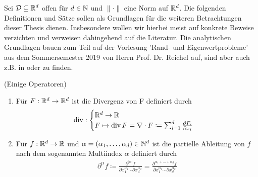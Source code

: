 Sei $\mathcal{D} \subseteq \mathbb{R}^d$ offen für $d\in \mathbb{N}$ und $\lVert \cdot \rVert$ eine Norm auf $\mathbb{R}^d$.
Die folgenden Definitionen und Sätze sollen als Grundlagen für die weiteren Betrachtungen dieser Thesis dienen. Insbesondere wollen wir hierbei meist auf konkrete Beweise verzichten und verweisen dahingehend auf die Literatur. 
Die analytischen Grundlagen bauen zum Teil auf der Vorlesung 'Rand- und Eigenwertprobleme' aus dem Sommersemester 2019 von Herrn Prof. Dr. Reichel auf, sind aber auch  z.B. in \cite{dobrowolski2010angewandte} oder \cite{evans10} zu finden.
\begin{Definition}(Einige Operatoren)
	\begin{enumerate}[label=(\alph*)]
		\item Für $F: \mathbb{R}^d \to \mathbb{R}^d$ ist die Divergenz von F definiert durch
			\begin{align*}
				\operatorname{div}  : \begin{cases}
				\mathbb{R}^d  \to \mathbb{R} \\
				F \mapsto \operatorname{div} F= \nabla \cdot  F \coloneqq \sum_{i=1}^{d} \frac{\partial F_i}{ \partial x_i}
				\end{cases}
			\end{align*}
		\item Für $f: \mathbb{R}^d \to \mathbb{R}$ und $\alpha = (\alpha_1,\dots,\alpha_d) \in \mathbb{N}^d$ ist die partielle Ableitung von $f$ nach dem sogenannten Multiindex $\alpha$ definiert durch
			\begin{align*}
				\partial^{\alpha}f \coloneqq 
				\frac{\partial^{|\alpha|} f}{\partial x_1 ^{\alpha_1} \cdots  \partial x_d^{\alpha_d} } 
				=\frac{\partial^{\alpha_1+\dots +\alpha_d} f}{\partial x_1 ^{\alpha_1} \cdots  \partial x_d^{\alpha_d} } 
			\end{align*}
	\end{enumerate}
\end{Definition}



